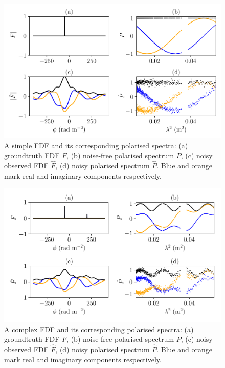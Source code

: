     \begin{figure}
      \centering
      \includegraphics[width=0.9\linewidth]{faraday-images/spectra_simple.pdf}
      \caption[A simple FDF and its corresponding polarised spectra.]{A simple FDF and its corresponding polarised spectra: (a) groundtruth FDF $F$, (b) noise-free polarised spectrum $P$, (c) noisy observed FDF $\hat F$, (d) noisy polarised spectrum $\hat P$. Blue and orange mark real and imaginary components respectively.}
      \label{fig:faraday-simple-fdf}
    \end{figure}

    \begin{figure}
      \centering
      \includegraphics[width=0.94\linewidth]{faraday-images/spectra.pdf}
      \caption[A complex FDF and its corresponding polarised spectra.]{A complex FDF and its corresponding polarised spectra: (a) groundtruth FDF $F$, (b) noise-free polarised spectrum $P$, (c) noisy observed FDF $\hat F$, (d) noisy polarised spectrum $\hat P$. Blue and orange mark real and imaginary components respectively.}
      \label{fig:faraday-complex-fdf}
    \end{figure}

